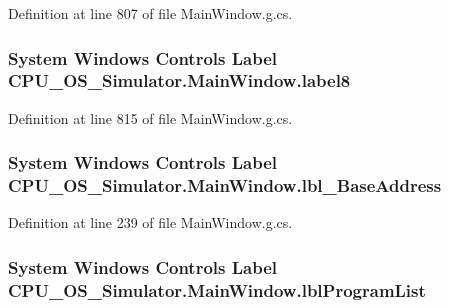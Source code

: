 Definition at line 807 of file Main\+Window.\+g.\+cs.

\hypertarget{class_c_p_u___o_s___simulator_1_1_main_window_a216fc6a1692d8a8f8b80b08348c1dcd4}{}
\subsubsection[{label8}]{\setlength{\rightskip}{0pt plus 5cm}System Windows Controls Label C\+P\+U\+\_\+\+O\+S\+\_\+\+Simulator.\+Main\+Window.\+label8\hspace{0.3cm}{\ttfamily [package]}}\label{class_c_p_u___o_s___simulator_1_1_main_window_a216fc6a1692d8a8f8b80b08348c1dcd4}


Definition at line 815 of file Main\+Window.\+g.\+cs.

\hypertarget{class_c_p_u___o_s___simulator_1_1_main_window_ae3adff2ef98d792ce094dcc229c293a8}{}
\subsubsection[{lbl\+\_\+\+Base\+Address}]{\setlength{\rightskip}{0pt plus 5cm}System Windows Controls Label C\+P\+U\+\_\+\+O\+S\+\_\+\+Simulator.\+Main\+Window.\+lbl\+\_\+\+Base\+Address\hspace{0.3cm}{\ttfamily [package]}}\label{class_c_p_u___o_s___simulator_1_1_main_window_ae3adff2ef98d792ce094dcc229c293a8}


Definition at line 239 of file Main\+Window.\+g.\+cs.

\hypertarget{class_c_p_u___o_s___simulator_1_1_main_window_a9cbfc378965cf635e61c760e11dd5c8a}{}
\subsubsection[{lbl\+Program\+List}]{\setlength{\rightskip}{0pt plus 5cm}System Windows Controls Label C\+P\+U\+\_\+\+O\+S\+\_\+\+Simulator.\+Main\+Window.\+lbl\+Program\+List\hspace{0.3cm}{\ttfamily [package]}}\label{class_c_p_u___o_s___simulator_1_1_main_window_a9cbfc378965cf635e61c760e11dd5c8a}


